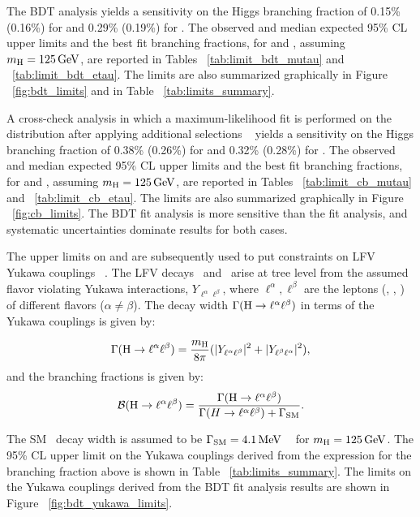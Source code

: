 The BDT analysis yields a sensitivity on the Higgs branching fraction of 0.15\% (0.16\%) for \Hmt and 0.29\% (0.19\%) for \Het. The observed and median expected 95\% CL upper limits and the best fit branching fractions, for \BHmt and \BHet, assuming $m_{\text{H}} = 125 \,\text{Ge\hspace{-.08em}V}$, are reported in Tables ~\ref{tab:limit_bdt_mutau} and ~\ref{tab:limit_bdt_etau}. The limits are also summarized graphically in Figure ~\ref{fig:bdt_limits} and in Table ~\ref{tab:limits_summary}.

A cross-check analysis in which a maximum-likelihood fit is performed on the \mcol distribution after applying additional selections ~\cite{Sirunyan:2017xzt} yields a sensitivity on the Higgs branching fraction of 0.38\% (0.26\%) for \Hmt and 0.32\% (0.28\%) for \Het. The observed and median expected 95\% CL upper limits and the best fit branching fractions, for \BHmt and \BHet, assuming $m_{\text{H}} = 125 \,\text{Ge\hspace{-.08em}V}$, are reported in Tables ~\ref{tab:limit_cb_mutau} and ~\ref{tab:limit_cb_etau}. The limits are also summarized graphically in Figure ~\ref{fig:cb_limits}. The BDT fit analysis is more sensitive than the \mcol fit analysis, and systematic uncertainties dominate results for both cases.

The upper limits on \BHmt and \BHet are subsequently used to put constraints on LFV Yukawa couplings ~\cite{Harnik:2012pb}. The LFV decays \Pe{}\Pgt\, and \Pgm{}\Pgt\, arise at tree level from the assumed flavor violating Yukawa interactions, $Y_{\ell^\alpha\ell^{\beta}}$, where $\ell^\alpha, \ell^\beta$ are the leptons (\Pe, \Pgm, \Pgt) of different flavors ($\alpha\ne\beta$). The decay width $\Gamma(\text{H} \to \ell^{\alpha} \ell^{\beta})$ in terms of the Yukawa couplings is given by:

\[\Gamma(\text{H} \to \ell^{\alpha} \ell^{\beta}) = \frac{m_{\text{H}}}{8\pi}(\lvert Y_{\ell^{\alpha}\ell^{\beta}}\rvert^2 + \lvert Y_{\ell^{\beta}\ell^{\alpha}}\rvert^2),\]
and the branching fractions is given by:
\[\mathcal{B}(\text{H} \to \ell^{\alpha} \ell^{\beta}) = \frac{\Gamma(\text{H} \to \ell^{\alpha} \ell^{\beta})}{\Gamma(H \to \ell^{\alpha} \ell^{\beta}) + \Gamma_{\text{SM}}}.\]

The SM \PH\, decay width is assumed to be $\Gamma_{\text{SM}} = 4.1\,\text{Me\hspace{-.08em}V}$ ~\cite{Denner:2011mq} for $m_{\text{H}} = 125\,\text{Ge\hspace{-.08em}V}$. The 95\% CL upper limit on the Yukawa couplings derived from the expression for the branching fraction above is shown in Table ~\ref{tab:limits_summary}. The limits on the Yukawa couplings derived from the BDT fit analysis results are shown in Figure ~\ref{fig:bdt_yukawa_limits}.

